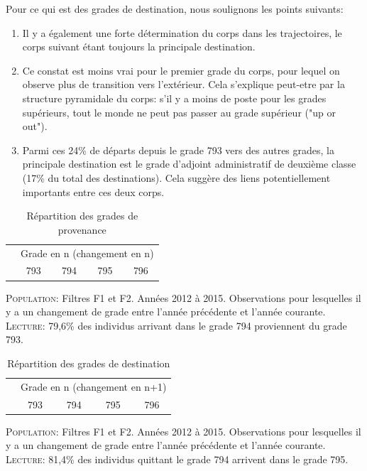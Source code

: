 \documentclass[11pt,a4paper]{article}
\begin{document}
Pour ce qui est des grades de destination, nous soulignons les points suivants: 
\begin{enumerate}[leftmargin=1cm ,parsep=0cm,itemsep=0cm,topsep=0cm] 
\item Il y a également une forte détermination du corps dans les trajectoires, le corps suivant étant toujours la principale destination. 
\item Ce constat est moins vrai pour le premier grade du corps, pour lequel on observe plus de transition vers l'extérieur. Cela s'explique peut-etre par la structure pyramidale du corps: s'il y a moins de poste pour les grades supérieurs, tout le monde ne peut pas passer au grade supérieur ("up or out"). 
\item Parmi ces 24\% de départs depuis le grade 793 vers des autres grades, la principale destination est le grade d'adjoint administratif de deuxième classe (17\% du total des destinations). Cela suggère des liens potentiellement importants entre ces deux corps.
\end{enumerate}


\medskip

\begin{table}[h!]
\centering
\caption{Répartition des grades de provenance} 
\label{entry}
\begin{tabular}{lcccc}
\toprule
 & \multicolumn{4}{c}{Grade en n (changement en n)} \\
 & 793 & 794 & 795 & 796 \\ 
  \hline
  
   \hline
\bottomrule
\end{tabular}
\begin{minipage}{12cm}
\footnotesize
\textsc{Population:} Filtres F1 et F2. Années 2012 à 2015. Observations pour lesquelles il y a un changement de grade entre l'année précédente et l'année courante. \\
\textsc{Lecture:} 79,6\% des individus arrivant dans le grade 794 proviennent du grade 793.
\end{minipage}
\end{table}

\medskip


\begin{table}[h!]
\centering
\caption{Répartition des grades de destination} 
\label{exit}
\begin{tabular}{lcccc}
\toprule
 & \multicolumn{4}{c}{Grade en n (changement en n+1)} \\
 & 793 & 794 & 795 & 796 \\ 
  \hline
  
   \hline
\bottomrule
\end{tabular}
\begin{minipage}{12cm}
\footnotesize
\textsc{Population:} Filtres F1 et F2. Années 2012 à 2015. Observations pour lesquelles il y a un changement de grade entre l'année précédente et l'année courante. \\
\textsc{Lecture:} 81,4\% des individus quittant le grade 794 arrivent dans le grade 795.
\end{minipage}
\end{table}
\medskip
\end{document}

